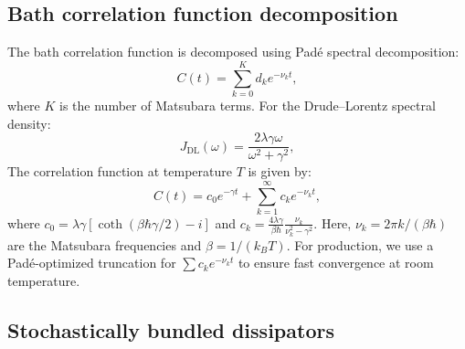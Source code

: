 \documentclass[11pt,a4paper]{article}
\begin{document}
\subsection{Bath correlation function decomposition}

The bath correlation function is decomposed using Padé spectral decomposition:
\begin{equation}
C(t) = \sum_{k=0}^{K} d_k e^{-\nu_k t},
\label{eq:SI_bath_correlation}
\end{equation}
where $K$ is the number of Matsubara terms. For the Drude--Lorentz spectral density:
\begin{equation}
J_{\mathrm{DL}}(\omega) = \frac{2\lambda\gamma\omega}{\omega^2 + \gamma^2},
\label{eq:SI_drude_lorentz}
\end{equation}
The correlation function at temperature $T$ is given by:
\begin{equation}
C(t) = c_0 e^{-\gamma t} + \sum_{k=1}^{\infty} c_k e^{-\nu_k t},
\label{eq:SI_correlation_DL}
\end{equation}
where $c_0 = \lambda\gamma[\coth(\beta\hbar\gamma/2) - i]$ and $c_k = \frac{4\lambda\gamma}{\beta\hbar} \frac{\nu_k}{\nu_k^2 - \gamma^2}$. Here, $\nu_k = 2\pi k/(\beta\hbar)$ are the Matsubara frequencies and $\beta = 1/(k_B T)$. For production, we use a Padé-optimized truncation for $\sum c_k e^{-\nu_k t}$ to ensure fast convergence at room temperature.

\subsection{Stochastically bundled dissipators}
\end{document}
